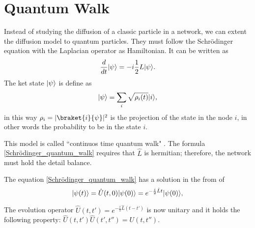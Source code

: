 \section{Quantum Walk}
Instead of studying the diffusion of a classic particle in a network, we can extent the diffusion model to quantum particles. 
They must follow the Schrödinger equation with the Laplacian operator as Hamiltonian. It can be written as
\begin{equation}\label{Schrödinger_quantum_walk}
    \frac{d}{dt}\lvert\psi\rangle = -i\frac{1}{2}L\lvert\psi\rangle.
\end{equation}
The ket state $\lvert\psi\rangle$ is define as
\begin{equation}\label{ket_state_quantum}
    \lvert\psi\rangle = \sum_i \sqrt{\rho_i(t)} \lvert i\rangle,
\end{equation}
in this way $\rho_i = |\braket{i}{\psi}|^2$ is the projection of the state in the node $i$, in other words the probability to be in the state $i$.

This model is called  “continuos time quantum walk" \cite{Farhi_98}.
The formula \eqref{Schrödinger_quantum_walk} requires that $\hat L$ is hermitian; therefore, the network must hold the detail balance.

The equation \eqref{Schrödinger_quantum_walk} has a solution in the from of 
\begin{equation}
    \lvert\psi(t)\rangle = \hat U(t,0) \lvert\psi(0)\rangle = e^{-\frac{i}{2}\hat L t} \lvert\psi(0)\rangle,
\end{equation}

The evolution operator $\hat U(t,t') =e^{-\frac{i}{2}\hat L (t-t')} $ is now unitary and it holds the following property: $\hat U(t,t')\hat U(t',t'') = U(t,t'')$.

